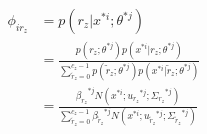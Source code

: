 \documentclass[runningheads,openany]{xhlPaper}
\begin{document}
\begin{equation}
\label{equ:pmmMixtureMixturePhi}
\begin{aligned}
{\phi _{i{r_z}}} &= p\left( {{r_z}|{x^{*i}};{\theta ^{*j}}} \right)\\
 &= \frac{{p\left( {{r_z};{\theta ^{*j}}} \right)p\left( {{x^{*i}}|{r_z};{\theta ^{*j}}} \right)}}{{\sum\limits_{{{\tilde r}_z} = 0}^{{c_z} - 1} {p\left( {{{\tilde r}_z};{\theta ^{*j}}} \right)p\left( {{x^{*i}}|{{\tilde r}_z};{\theta ^{*j}}} \right)} }}\\
 &= \frac{{{\beta _{{r_z}}}^{*j}N\left( {{x^{*i}};{u_{{r_z}}}^{*j};{\Sigma _{{r_z}}}^{*j}} \right)}}{{\sum\limits_{{{\tilde r}_z} = 0}^{{c_z} - 1} {{\beta _{{{\tilde r}_z}}}^{*j}N\left( {{x^{*i}};{u_{{{\tilde r}_z}}}^{*j};{\Sigma _{{{\tilde r}_z}}}^{*j}} \right)} }}
\end{aligned}
\end{equation}
\end{document}
